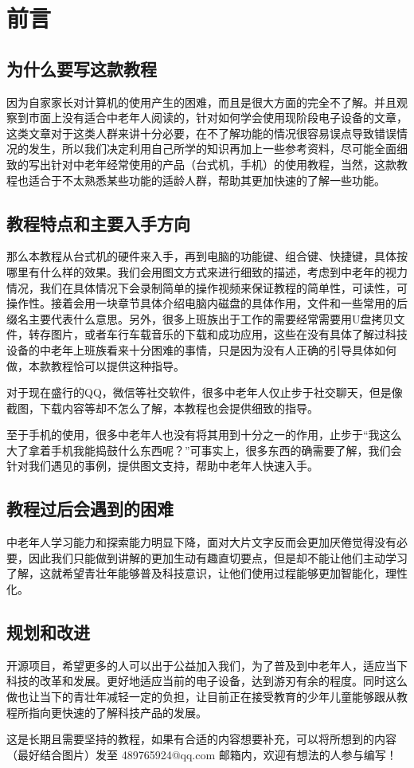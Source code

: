 \chapter{前言}

\section{为什么要写这款教程}
因为自家家长对计算机的使用产生的困难，而且是很大方面的完全不了解。并且观察到市面上没有适合中老年人阅读的，针对如何学会使用现阶段电子设备的文章，这类文章对于这类人群来讲十分必要，在不了解功能的情况很容易误点导致错误情况的发生，所以我们决定利用自己所学的知识再加上一些参考资料，尽可能全面细致的写出针对中老年经常使用的产品（台式机，手机）的使用教程，当然，这款教程也适合于不太熟悉某些功能的适龄人群，帮助其更加快速的了解一些功能。

\section{教程特点和主要入手方向}
那么本教程从台式机的硬件来入手，再到电脑的功能键、组合键、快捷键，具体按哪里有什么样的效果。我们会用图文方式来进行细致的描述，考虑到中老年的视力情况，我们在具体情况下会录制简单的操作视频来保证教程的简单性，可读性，可操作性。接着会用一块章节具体介绍电脑内磁盘的具体作用，文件和一些常用的后缀名主要代表什么意思。另外，很多上班族出于工作的需要经常需要用U盘拷贝文件，转存图片，或者车行车载音乐的下载和成功应用，这些在没有具体了解过科技设备的中老年上班族看来十分困难的事情，只是因为没有人正确的引导具体如何做，本款教程恰可以提供这种指导。


对于现在盛行的QQ，微信等社交软件，很多中老年人仅止步于社交聊天，但是像截图，下载内容等却不怎么了解，本教程也会提供细致的指导。

至于手机的使用，很多中老年人也没有将其用到十分之一的作用，止步于“我这么大了拿着手机我能捣鼓什么东西呢？”可事实上，很多东西的确需要了解，我们会针对我们遇见的事例，提供图文支持，帮助中老年人快速入手。

\section{教程过后会遇到的困难}
中老年人学习能力和探索能力明显下降，面对大片文字反而会更加厌倦觉得没有必要，因此我们只能做到讲解的更加生动有趣直切要点，但是却不能让他们主动学习了解，这就希望青壮年能够普及科技意识，让他们使用过程能够更加智能化，理性化。


\section{规划和改进}
开源项目，希望更多的人可以出于公益加入我们，为了普及到中老年人，适应当下科技的改革和发展。更好地适应当前的电子设备，达到游刃有余的程度。同时这么做也让当下的青壮年减轻一定的负担，让目前正在接受教育的少年儿童能够跟从教程所指向更快速的了解科技产品的发展。

这是长期且需要坚持的教程，如果有合适的内容想要补充，可以将所想到的内容（最好结合图片）发至 489765924@qq.com 邮箱内，欢迎有想法的人参与编写！